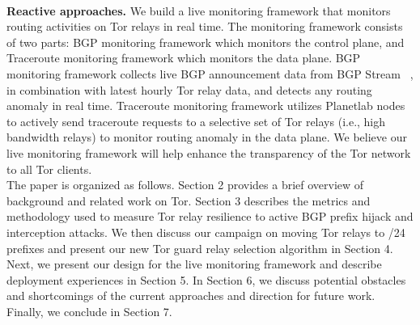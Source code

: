 \\
\textbf{Reactive approaches.} We build a live monitoring framework that monitors routing activities on Tor relays in real time. The monitoring framework consists of two parts: BGP monitoring framework which monitors the control plane, and Traceroute monitoring framework which monitors the data plane. BGP monitoring framework collects live BGP announcement data from BGP Stream ~\cite{bgpstream}, in combination with latest hourly Tor relay data, and detects any routing anomaly in real time. Traceroute monitoring framework utilizes Planetlab nodes to actively send traceroute requests to a selective set of Tor relays (i.e., high bandwidth relays) to monitor routing anomaly in the data plane. We believe our live monitoring framework will help enhance the transparency of the Tor network to all Tor clients. 
\\
The paper is organized as follows. Section 2 provides a brief overview of background and related work on Tor.  Section 3 describes the metrics and methodology used to measure Tor relay resilience to active BGP prefix hijack and interception attacks. We then discuss our campaign on moving Tor relays to /24 prefixes and present our new Tor guard relay selection algorithm in Section 4. Next, we present our design for the live monitoring framework and describe deployment experiences in Section 5. In Section 6, we discuss potential obstacles and shortcomings of the current approaches and direction for future work. Finally, we conclude in Section 7. 
%
